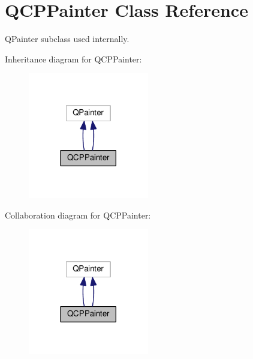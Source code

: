 \hypertarget{class_q_c_p_painter}{}\section{Q\+C\+P\+Painter Class Reference}
\label{class_q_c_p_painter}


Q\+Painter subclass used internally.  




Inheritance diagram for Q\+C\+P\+Painter\+:\nopagebreak
\begin{figure}[H]
\begin{center}
\leavevmode
\includegraphics[width=149pt]{class_q_c_p_painter__inherit__graph}
\end{center}
\end{figure}


Collaboration diagram for Q\+C\+P\+Painter\+:\nopagebreak
\begin{figure}[H]
\begin{center}
\leavevmode
\includegraphics[width=149pt]{class_q_c_p_painter__coll__graph}
\end{center}
\end{figure}
